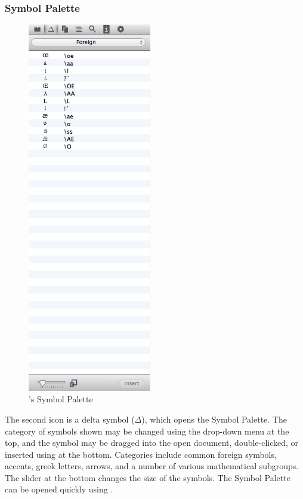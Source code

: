 \subsubsection{Symbol Palette}
\begin{figure}
\includegraphics[width=0.48\textwidth, trim = 0 9.5in 0 0, clip = true]{TeXnicle-Images/texnicle-nav-symbolpalette.png}
\caption{\texnicle's Symbol Palette}
\label{fig:texnicle-nav-symbolpalette}
\end{figure}
The second icon is a delta symbol ($\Delta$), which opens the Symbol Palette. The category of symbols shown may be changed using the drop-down menu at the top, and the symbol may be dragged into the open document, double-clicked, or inserted using  at the bottom. Categories include common foreign symbols, accents, greek letters, arrows, and a number of various mathematical subgroups. The slider at the bottom changes the size of the symbols. The Symbol Palette can be opened quickly using .

